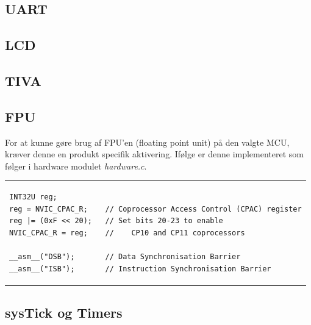 \subsection{UART}

\subsection{LCD}
\subsection{TIVA}

\subsection{FPU}
For at kunne gøre brug af FPU'en (floating point unit) på den valgte MCU, kræver denne en produkt specifik aktivering.
Ifølge \cite[afsnit 3.1.5.7 s. 132]{tm4c123gh6pm} er denne implementeret som følger i hardware modulet \textit{hardware.c}.

\begin{tabular}{l}
\begin{lstlisting}[title=init\_FPU()]
INT32U reg;
reg = NVIC_CPAC_R;    // Coprocessor Access Control (CPAC) register
reg |= (0xF << 20);   // Set bits 20-23 to enable 
NVIC_CPAC_R = reg;    // 	CP10 and CP11 coprocessors

__asm__("DSB");       // Data Synchronisation Barrier
__asm__("ISB");       // Instruction Synchronisation Barrier
\end{lstlisting}
\end{tabular}

\subsection{sysTick og Timers}


